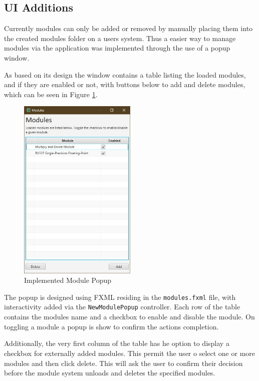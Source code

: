 \subsection{\ac{UI} Additions}
Currently modules can only be added or removed by manually placing them into the created modules folder on a users system. Thus a easier way to manage modules via the application was implemented through the use of a popup window.

As based on its design the window contains a table listing the loaded modules, and if they are enabled or not, with buttons below to add and delete modules, which can be seen in Figure \ref{fig:module_popup}.

\begin{figure}[H]
    \centering
    \includegraphics[width=0.5\textwidth]{dissertation/DATA/module_popup.jpg}
    \caption{Implemented Module Popup}
    \label{fig:module_popup}
\end{figure}

The popup is designed using FXML residing in the \texttt{modules.fxml} file, with interactivity added via the \texttt{NewModulePopup} controller. Each row of the table contains the modules name and a checkbox to enable and disable the module. On toggling a module a popup is show to confirm the actions completion.

Additionally, the very first column of the table has he option to display a checkbox for externally added modules. This permit the user o select one or more modules and then click delete. This will ask the user to confirm their decision before the module system unloads and deletes the specified modules.

